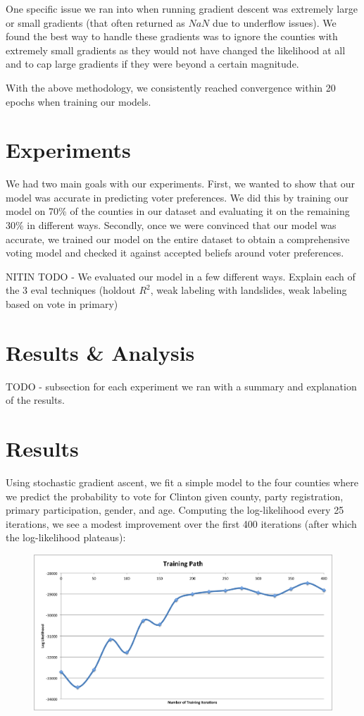 \documentclass[10pt, letterpaper]{article}
\begin{document}
One specific issue we ran into when running gradient descent was extremely large or small gradients (that often returned as $NaN$ due to underflow issues). We found the best way to handle these gradients was to ignore the counties with extremely small gradients as they would not have changed the likelihood at all and to cap large gradients if they were beyond a certain magnitude.

With the above methodology, we consistently reached convergence within 20 epochs when training our models.

\section{Experiments}

We had two main goals with our experiments. First, we wanted to show that our model was accurate in predicting voter preferences. We did this by training our model on 70\% of the counties in our dataset and evaluating it on the remaining 30\% in different ways. Secondly, once we were convinced that our model was accurate, we trained our model on the entire dataset to obtain a comprehensive voting model and checked it against accepted beliefs around voter preferences.

NITIN TODO - We evaluated our model in a few different ways. Explain each of the 3 eval techniques (holdout $R^2$, weak labeling with landslides, weak labeling based on vote in primary)

\section{Results \& Analysis}

TODO - subsection for each experiment we ran with a summary and explanation of the results.



\section{Results}

Using stochastic gradient ascent, we fit a simple model to the four counties where we predict the probability to vote for Clinton given county, party registration, primary participation, gender, and age. Computing the log-likelihood every 25 iterations, we see a modest improvement over the first 400 iterations (after which the log-likelihood plateaus): 
\begin{figure}[H]
\centering
\includegraphics[scale = 0.4]{TrainingPath}
\end{figure}
\end{document}
